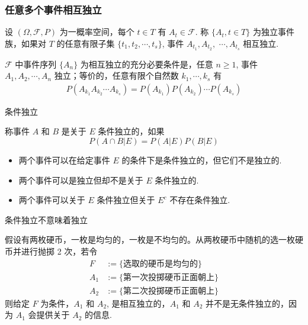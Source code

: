 \begin{frame}
	\frametitle{任意多个事件相互独立}
	\begin{defi}
		设 $(\Omega,\mathcal{F}, P)$ 为一概率空间，每个 $t\in T$ 有 $A_t\in \mathcal{F}$. 称 $\{A_t, t\in T\}$ 为独立事件族，如果对 $T$ 的任意有限子集 $\{t_1,t_2,\cdots, t_s\}$, 事件 $A_{t_1}, A_{t_2},$ $\cdots, A_{t_s}$ 相互独立.
	\end{defi}


	\vspace{0.8cm}
	\pause
	\begin{exam}
		$\mathcal{F}$ 中事件序列 $\{A_n\}$ 为相互独立的充分必要条件是，任意 $n\geq 1$, 事件 $A_1,A_2, \cdots, A_n$ 独立；等价的，任意有限个自然数 $k_1,\cdots, k_s$ 有
		\begin{eqnarray*}
			P(A_{k_1}A_{k_2}\cdots A_{k_s})=P(A_{k_1})P(A_{k_2})\cdots P(A_{k_s})
		\end{eqnarray*}

	\end{exam}

\end{frame}


\begin{frame}{条件独立}
\begin{defi}
称事件 $A$ 和 $B$ 是关于 $E$ 条件独立的，如果 $$P (A\cap B|E)=P (A|E) P (B|E)$$
\end{defi}
\pause
\begin{itemize}[<+-|alert@+>]
\item 两个事件可以在给定事件 $E$ 的条件下是条件独立的，但它们不是独立的.
\item 两个事件可以是独立但却不是关于 $E$ 条件独立的.
\item 两个事件可以关于 $E$ 条件独立但关于 $E^c$ 不存在条件独立.
\end{itemize}
\end{frame}

\begin{frame}{条件独立不意味着独立}
\begin{exam}
假设有两枚硬币，一枚是均匀的，一枚是不均匀的。从两枚硬币中随机的选一枚硬币并进行抛掷 2 次，若令
\begin{align*}
  F &:=\{\mbox{选取的硬币是均匀的}\}\\
   A_{1}&:= \{\mbox{第一次投掷硬币正面朝上}\}\\
   A_{2}&:= \{\mbox{第二次投掷硬币正面朝上}\}
\end{align*}
则给定 $F$ 为条件，$A_1$ 和 $A_2$, 是相互独立的，$A_1$ 和 $A_2$ 并不是无条件独立的，因为 $A_1$ 会提供关于 $A_2$ 的信息.
\end{exam}
\end{frame}

